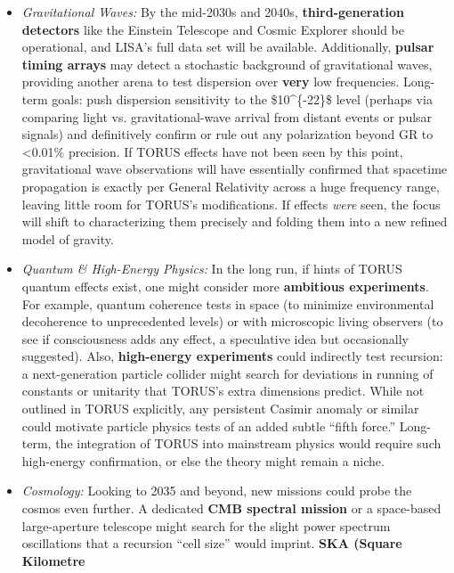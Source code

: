 \documentclass[
]{article}
\begin{document}
{\begin{itemize}
  \begin{itemize}
  \item
    \emph{Gravitational Waves:} By the mid-2030s and 2040s,
    \textbf{third-generation detectors} like the Einstein Telescope and
    Cosmic Explorer should be operational, and LISA's full data set will
    be available. Additionally, \textbf{pulsar timing arrays} may detect
    a stochastic background of gravitational waves, providing another
    arena to test dispersion over \textbf{very} low frequencies.
    Long-term goals: push dispersion sensitivity to the
    \$10\^{}\{-22\}\$ level (perhaps via comparing light vs.
    gravitational-wave arrival from distant events or pulsar signals)
    and definitively confirm or rule out any polarization beyond GR to
    \textless0.01\% precision. If TORUS effects have not been seen by
    this point, gravitational wave observations will have essentially
    confirmed that spacetime propagation is exactly per General
    Relativity across a huge frequency range, leaving little room for
    TORUS's modifications. If effects \emph{were} seen, the focus will
    shift to characterizing them precisely and folding them into a new
    refined model of gravity.
  \item
    \emph{Quantum \& High-Energy Physics:} In the long run, if hints of
    TORUS quantum effects exist, one might consider more
    \textbf{ambitious experiments}. For example, quantum coherence tests
    in space (to minimize environmental decoherence to unprecedented
    levels) or with microscopic living observers (to see if
    consciousness adds any effect, a speculative idea but occasionally
    suggested). Also, \textbf{high-energy experiments} could indirectly
    test recursion: a next-generation particle collider might search for
    deviations in running of constants or unitarity that TORUS's extra
    dimensions predict. While not outlined in TORUS explicitly, any
    persistent Casimir anomaly or similar could motivate particle
    physics tests of an added subtle ``fifth force.'' Long-term, the
    integration of TORUS into mainstream physics would require such
    high-energy confirmation, or else the theory might remain a niche.
  \item
    \emph{Cosmology:} Looking to 2035 and beyond, new missions could
    probe the cosmos even further. A dedicated \textbf{CMB spectral
    mission} or a space-based large-aperture telescope might search for
    the slight power spectrum oscillations that a recursion ``cell
    size'' would imprint\hspace{0pt}. \textbf{SKA (Square Kilometre
}
\end{itemize}
\end{itemize}}
\end{document}
